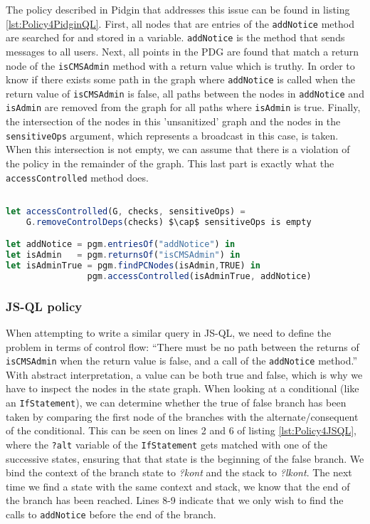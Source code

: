 The policy described in Pidgin that addresses this issue can be found in listing \ref{lst:Policy4PidginQL}. First, all nodes that are entries of the \texttt{addNotice} method are searched for and stored in a variable. \texttt{addNotice} is the method that sends messages to all users. Next, all points in the PDG are found that match a return node of the \texttt{isCMSAdmin} method with a return value which is truthy. In order to know if there exists some path in the graph where \texttt{addNotice} is called when the return value of \texttt{isCMSAdmin} is false, all paths between the nodes in \texttt{addNotice} and \texttt{isAdmin} are removed from the graph for all paths where \texttt{isAdmin} is true. Finally, the intersection of the nodes in this 'unsanitized' graph and the nodes in the \texttt{sensitiveOps} argument, which represents a broadcast in this case, is taken. When this intersection is not empty, we can assume that there is a violation of the policy in the remainder of the graph. This last part is exactly what the \texttt{accessControlled} method does.

\begin{lstlisting}[label={lst:Policy4PidginQL},language=JavaScript,caption=Policy 4 in PidginQL,mathescape=true]  % float=t?

let accessControlled(G, checks, sensitiveOps) = 
    G.removeControlDeps(checks) $\cap$ sensitiveOps is empty

let addNotice = pgm.entriesOf("addNotice") in
let isAdmin   = pgm.returnsOf("isCMSAdmin") in 
let isAdminTrue = pgm.findPCNodes(isAdmin,TRUE) in
                pgm.accessControlled(isAdminTrue, addNotice)
\end{lstlisting}

\subsubsection{JS-QL policy}

When attempting to write a similar query in JS-QL, we need to define the problem in terms of control flow: ``There must be no path between the returns of \texttt{isCMSAdmin} when the return value is false, and a call of the \texttt{addNotice} method.'' With abstract interpretation, a value can be both true and false, which is why we have to inspect the nodes in the state graph. When looking at a conditional (like an \texttt{IfStatement}), we can determine whether the true of false branch has been taken by comparing the first node of the branches with the alternate/consequent of the conditional. This can be seen on lines 2 and 6 of listing \ref{lst:Policy4JSQL}, where the \texttt{?alt} variable of the \texttt{IfStatement} gets matched with one of the successive states, ensuring that that state is the beginning of the false branch. We bind the context of the branch state to \textit{?kont} and the stack to \textit{?lkont}. The next time we find a state with the same context and stack, we know that the end of the branch has been reached. Lines 8-9 indicate that we only wish to find the calls to \texttt{addNotice} before the end of the branch.

